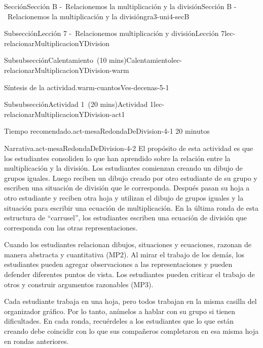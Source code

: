 \documentclass[oneside,10pt,]{article}
\newlength{\fillinmaxwidth}
\newlength{\fillincontract}
\newlength{\charmaxwidth}\setlength{\charmaxwidth}{0.5em}
\newlength{\charminwidth}\setlength{\charminwidth}{0.1em}
\newlength{\fillinheight}
\newcommand{\fillintext}[1]{%
\setlength{\fillinmaxwidth}{#1\charmaxwidth}%
\setlength{\fillincontract}{#1\charminwidth}%
\setlength{\fillinheight}{\baselineskip}\addtolength{\fillinheight}{1.2pt}%
\strut\nobreak\leaders\vbox{\hrule width 0.3pt height 0.3pt \vskip -1.2pt}\hskip 1\fillinmaxwidth minus \fillincontract\nobreak\strut%
}
\begin{document}
\begin{sectionptx}{Sección}{Sección B -~Relacionemos la multiplicación y la división}{}{Sección B -~Relacionemos la multiplicación y la división}{}{}{gra3-uni4-secB}
\begin{subsectionptx}{Subsección}{Lección 7 -~Relacionemos multiplicación y división}{}{Lección 7}{}{}{lec-relacionarMultiplicacionYDivision}
\begin{subsubsectionptx}{Subsubsección}{Calentamiento~(10 mins)}{}{Calentamiento}{}{}{lec-relacionarMultiplicacionYDivision-warm}
\begin{paragraphs}{Síntesis de la actividad.}{warm-cuantosVes-decenas-5-1}
\begin{itemize}[label=\textbullet]
\end{itemize}
\end{paragraphs}%
\end{subsubsectionptx}
%
%
\typeout{************************************************}
\typeout{************************************************}
%
\begin{subsubsectionptx}{Subsubsección}{Actividad 1~(20 mins)}{}{Actividad 1}{}{}{lec-relacionarMultiplicacionYDivision-act1}
\par
\begin{paragraphs}{Tiempo recomendado.}{act-mesaRedondaDeDivision-4-1}%
20 minutos%
\end{paragraphs}%
\begin{paragraphs}{Narrativa.}{act-mesaRedondaDeDivision-4-2}%
El propósito de esta actividad es que los estudiantes consoliden lo que han aprendido sobre la relación entre la multiplicación y la división. Los estudiantes comienzan creando un dibujo de grupos iguales. Luego reciben un dibujo creado por otro estudiante de su grupo y escriben una situación de división que le corresponda. Después pasan su hoja a otro estudiante y reciben otra hoja y utilizan el dibujo de grupos iguales y la situación para escribir una ecuación de multiplicación. En la última ronda de esta estructura de “carrusel”, los estudiantes escriben una ecuación de división que corresponda con las otras representaciones.%
\par
Cuando los estudiantes relacionan dibujos, situaciones y ecuaciones, razonan de manera abstracta y cuantitativa (MP2). Al mirar el trabajo de los demás, los estudiantes pueden agregar observaciones a las representaciones y pueden defender diferentes puntos de vista. Los estudiantes pueden criticar el trabajo de otros y construir argumentos razonables (MP3).%
\par
Cada estudiante trabaja en una hoja, pero todos trabajan en la misma casilla del organizador gráfico. Por lo tanto, anímelos a hablar con su grupo si tienen dificultades. En cada ronda, recuérdeles a los estudiantes que lo que están creando debe coincidir con lo que sus compañeros completaron en esa misma hoja en rondas anteriores.%

\end{paragraphs}
\end{subsubsectionptx}
\end{subsectionptx}
\end{sectionptx}
\end{document}
